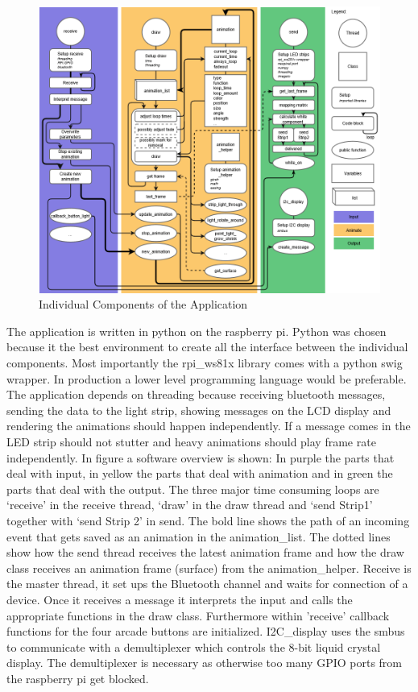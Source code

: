 \begin{figure}
\centering
    \includegraphics[width=1.12\textwidth]{fig/Flow.png}
    \caption[Software Diagram]{Individual Components of the Application}
    \label{fig:software}
\end{figure}
The application is written in python on the raspberry pi. Python was chosen because it the best environment to create all the interface between the individual components. Most importantly the rpi\_ws81x library comes with a python swig wrapper. In production a lower level programming language would be preferable. The application depends on threading because receiving bluetooth messages, sending the data to the light strip, showing messages on the LCD display and rendering the animations should happen independently. If a message comes in the LED strip should not stutter and heavy animations should play frame rate independently. 
In figure  a software overview is shown: In purple the parts that deal with input, in yellow the parts that deal with animation and in green the parts that deal with the output. The three major time consuming loops are ‘receive’ in the receive thread, ‘draw’ in the draw thread and ‘send Strip1’ together with ‘send Strip 2’ in send. The bold line shows the path of an incoming event that gets saved as an animation in the animation\_list. The dotted lines show how the send thread receives the latest animation frame and how the draw class receives an animation frame (surface) from the animation\_helper. 
Receive is the master thread, it set ups the Bluetooth channel and waits for connection of a device. Once it receives a message it interprets the input and calls the appropriate functions in the draw class. Furthermore within 'receive' callback functions for the four arcade buttons are initialized. 
I2C\_display uses the smbus to communicate with a demultiplexer which controls the 8-bit liquid crystal display. The demultiplexer is necessary as otherwise too many GPIO ports from the raspberry pi get blocked. 

